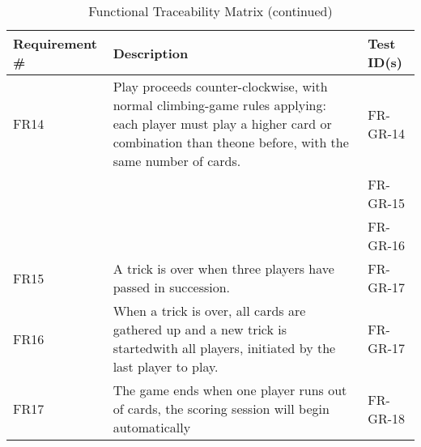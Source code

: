 \documentclass[12pt, titlepage]{article}
\begin{document}
\newpage

\begin{table}[h!]
\centering
\caption{Functional Traceability Matrix (continued)}
\begin{tabular}{|p{2.5cm} p{10cm} p{2.5cm}|} 
 \hline
 Requirement \# & Description & Test ID(s) \\ 
 \hline
 FR14 & Play proceeds counter-clockwise, with normal climbing-game rules applying:  each player must play a higher card or combination than theone before, with the same number of cards. & FR-GR-14 \\ 
  &  & FR-GR-15 \\ 
   &  & FR-GR-16 \\
 FR15 & A trick is over when three players have passed in succession. & FR-GR-17 \\ 
 FR16 & When a trick is over, all cards are gathered up and a new trick is startedwith all players, initiated by the last player to play. & FR-GR-17 \\ 
 FR17 & The game ends when one player runs out of cards, the scoring session will begin automatically & FR-GR-18 \\ 
 \hline
\end{tabular}
\end{table}

\newpage
\end{document}
